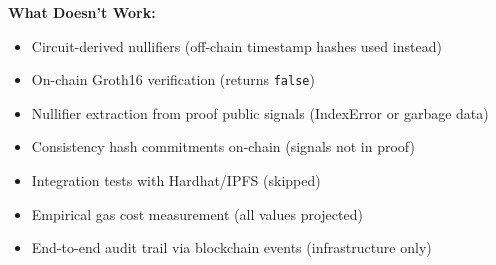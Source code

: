 \textbf{What Doesn't Work:}
\begin{itemize}
    \item Circuit-derived nullifiers (off-chain timestamp hashes used instead)
    \item On-chain Groth16 verification (returns \texttt{false})
    \item Nullifier extraction from proof public signals (IndexError or garbage data)
    \item Consistency hash commitments on-chain (signals not in proof)
    \item Integration tests with Hardhat/IPFS (skipped)
    \item Empirical gas cost measurement (all values projected)
    \item End-to-end audit trail via blockchain events (infrastructure only)
\end{itemize}

